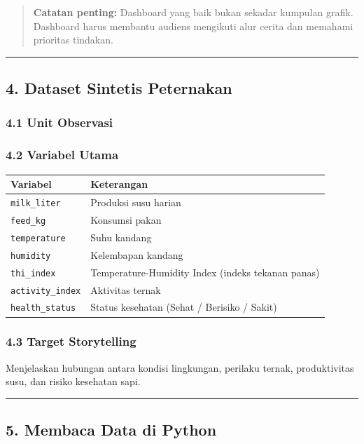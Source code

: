 \documentclass[12pt,a4paper]{article}
\begin{document}
\begin{quote}
\textbf{Catatan penting:} Dashboard yang baik bukan sekadar kumpulan grafik. Dashboard harus membantu audiens mengikuti alur cerita dan memahami prioritas tindakan.\end{quote}


\hrule


\subsection{4. Dataset Sintetis Peternakan}

\subsubsection{4.1 Unit Observasi}


\subsubsection{4.2 Variabel Utama}

\begin{tabular}{|l|l|}
\hline
Variabel & Keterangan \\
\hline
\texttt{milk_liter} & Produksi susu harian \\
\hline
\texttt{feed_kg} & Konsumsi pakan \\
\hline
\texttt{temperature} & Suhu kandang \\
\hline
\texttt{humidity} & Kelembapan kandang \\
\hline
\texttt{thi_index} & Temperature-Humidity Index (indeks tekanan panas) \\
\hline
\texttt{activity_index} & Aktivitas ternak \\
\hline
\texttt{health_status} & Status kesehatan (Sehat / Berisiko / Sakit) \\
\hline
\end{tabular}


\subsubsection{4.3 Target Storytelling}

Menjelaskan hubungan antara kondisi lingkungan, perilaku ternak, produktivitas susu, dan risiko kesehatan sapi.


\hrule


\subsection{5. Membaca Data di Python}
\end{document}
